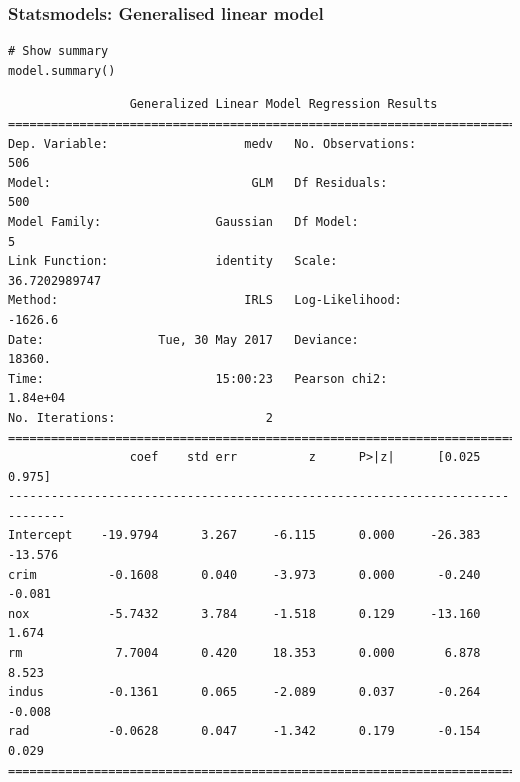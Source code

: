 \documentclass[pdf]{beamer}
\begin{document}
\begin{frame}[fragile]
\frametitle{Statsmodels: Generalised linear model}

\begin{lstlisting}[style=python]
# Show summary
model.summary() 
\end{lstlisting}

\vspace{-0.8cm}
{\fontsize{6}{7}\selectfont
\begin{verbatim}
                 Generalized Linear Model Regression Results                  
==============================================================================
Dep. Variable:                   medv   No. Observations:                  506
Model:                            GLM   Df Residuals:                      500
Model Family:                Gaussian   Df Model:                            5
Link Function:               identity   Scale:                   36.7202989747
Method:                          IRLS   Log-Likelihood:                -1626.6
Date:                Tue, 30 May 2017   Deviance:                       18360.
Time:                        15:00:23   Pearson chi2:                 1.84e+04
No. Iterations:                     2                                         
==============================================================================
                 coef    std err          z      P>|z|      [0.025      0.975]
------------------------------------------------------------------------------
Intercept    -19.9794      3.267     -6.115      0.000     -26.383     -13.576
crim          -0.1608      0.040     -3.973      0.000      -0.240      -0.081
nox           -5.7432      3.784     -1.518      0.129     -13.160       1.674
rm             7.7004      0.420     18.353      0.000       6.878       8.523
indus         -0.1361      0.065     -2.089      0.037      -0.264      -0.008
rad           -0.0628      0.047     -1.342      0.179      -0.154       0.029
==============================================================================
\end{verbatim}}

\end{frame}
\end{document}
